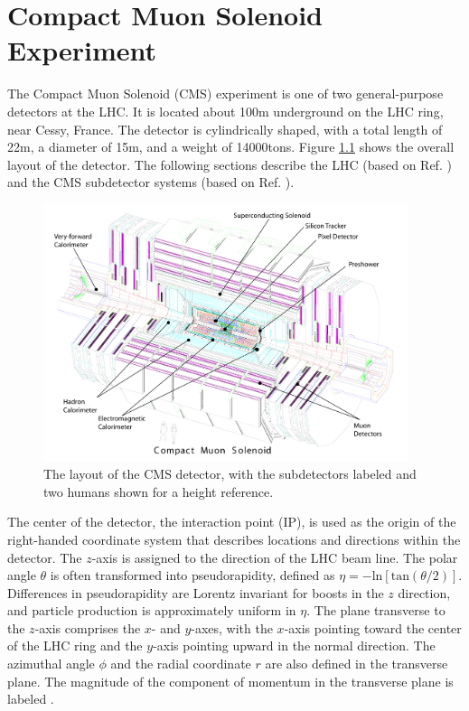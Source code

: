 \chapter{Compact Muon Solenoid Experiment
\label{ch:cmsexperiment}}

The Compact Muon Solenoid (CMS) experiment is one of two general-purpose detectors at the LHC. It is located about 100\unit{m} underground on the LHC ring, near Cessy, France. The detector is cylindrically shaped, with a total length of 22\unit{m}, a diameter of 15\unit{m}, and a weight of 14000\unit{tons}. Figure \ref{fig:cms-overall} shows the overall layout of the detector. The following sections describe the LHC (based on Ref. \cite{LHCmachine}) and the CMS subdetector systems (based on Ref. \cite{CMSJINST}).

\begin{figure}[hbt]
\begin{center}
\includegraphics[width=0.95\textwidth]{figures/cms_complete_labelled.pdf}
\caption{The layout of the CMS detector, with the subdetectors labeled and two humans shown for a height reference.}
\label{fig:cms-overall}
\end{center}
\end{figure}

The center of the detector, the interaction point (IP), is used as the origin of the right-handed coordinate system that describes locations and directions within the detector. The $z$-axis is assigned to the direction of the LHC beam line. The polar angle $\theta$ is often transformed into pseudorapidity, defined as $\eta = -\text{ln}[\text{tan}(\theta/2)]$. Differences in pseudorapidity are Lorentz invariant for boosts in the $z$ direction, and particle production is approximately uniform in $\eta$. The plane transverse to the $z$-axis comprises the $x$- and $y$-axes, with the $x$-axis pointing toward the center of the LHC ring and the $y$-axis pointing upward in the normal direction. The azimuthal angle $\phi$ and the radial coordinate $r$ are also defined in the transverse plane. The magnitude of the component of momentum in the transverse plane is labeled \pt.

